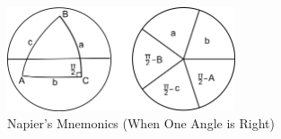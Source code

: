 \documentclass[12pt,a4paper]{memoir}
\theoremstyle{definition}
\begin{document}
\begin{figure}[H]
	\centering
	\includegraphics[width=0.6\textwidth]{IMG/Napier.png}
	\caption{Napier's Mnemonics (When One Angle is Right)}
	\label{fig:napierfive1}
\end{figure}




		
\end{document}
